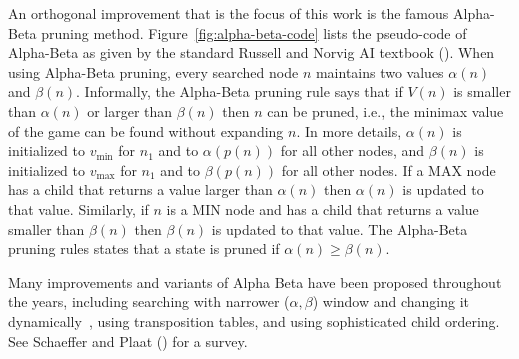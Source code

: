 \documentclass[letterpaper]{article} %
\newcommand{\MM}{\mathit{V}}
\newcommand{\vmax}{v_{\text{max}}}
\newcommand{\vmin}{v_{\text{min}}}
\newcommand{\rootnode}{\mathit{n_1}}
\begin{document}
An orthogonal improvement that is the focus of this work is the famous Alpha-Beta pruning method. 
Figure~\ref{fig:alpha-beta-code} lists the pseudo-code of Alpha-Beta as given by the standard Russell and Norvig AI textbook (\citeyear{russell2016artificial}). 
When using Alpha-Beta pruning, every searched node $n$ maintains two values $\alpha(n)$ and $\beta(n)$. 
Informally, the Alpha-Beta pruning rule says that if $\MM(n)$ is smaller than $\alpha(n)$ or larger than $\beta(n)$ then $n$ can be pruned, i.e., the minimax value of the game can be found without expanding $n$. In more details,  
$\alpha(n)$ is initialized to $\vmin$ for $\rootnode{}$ and to $\alpha(p(n))$ for all other nodes, and $\beta(n)$ is initialized to $\vmax$ for $\rootnode{}$ and to $\beta(p(n))$ for all other nodes. If a MAX node has a child that returns a value larger than $\alpha(n)$ then $\alpha(n)$ is updated to that value. Similarly, if $n$ is a MIN node and has a child that returns a value smaller than $\beta(n)$ then $\beta(n)$ is updated to that value. The Alpha-Beta pruning rules states that a state is pruned if $\alpha(n)\geq \beta(n)$.


Many improvements and variants of Alpha Beta have been proposed throughout the years, including searching with narrower ($\alpha, \beta$) window and changing it dynamically~\cite{pearl1980scout,reinefeld1983improvement}, using transposition tables, and using sophisticated child ordering. See
Schaeffer and Plaat (\citeyear{schaeffer1996new}) for a survey. 




\end{document}
